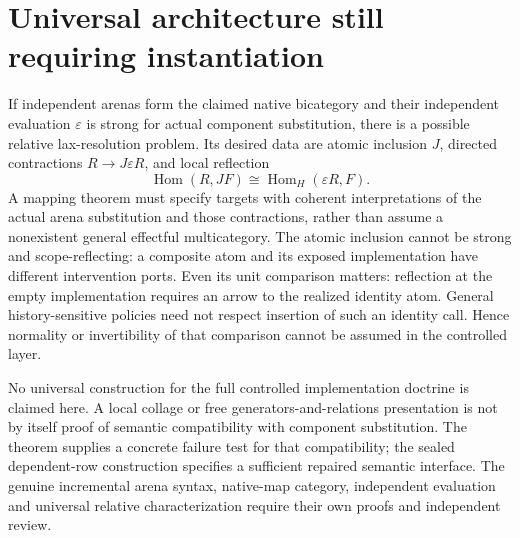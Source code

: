 \documentclass{article}
\begin{document}
\section{Universal architecture still requiring instantiation}
If independent arenas form the claimed native bicategory and their independent
evaluation $\varepsilon$ is strong for actual component substitution, there
is a possible relative lax-resolution problem. Its desired data are atomic
inclusion $J$, directed contractions $R\to J\varepsilon R$, and local
reflection
\[
 \operatorname{Hom}(R,JF)\cong
 \operatorname{Hom}_{H}(\varepsilon R,F).
\]
A mapping theorem must specify targets with coherent interpretations of the
actual arena substitution and those contractions, rather than assume a
nonexistent general effectful multicategory. The atomic inclusion cannot be
strong and scope-reflecting: a composite atom and its exposed implementation
have different intervention ports. Even its unit comparison matters:
reflection at the empty implementation requires an arrow to the realized
identity atom. General history-sensitive policies need not respect insertion
of such an identity call. Hence normality or invertibility of that comparison
cannot be assumed in the controlled layer.

No universal construction for the full controlled implementation doctrine is
claimed here. A local collage or free generators-and-relations presentation
is not by itself proof of semantic compatibility with component substitution.
The theorem supplies a concrete failure test for that compatibility; the
sealed dependent-row construction specifies a sufficient repaired semantic
interface. The genuine incremental arena syntax, native-map category,
independent evaluation and universal relative characterization require their
own proofs and independent review.
\end{document}

